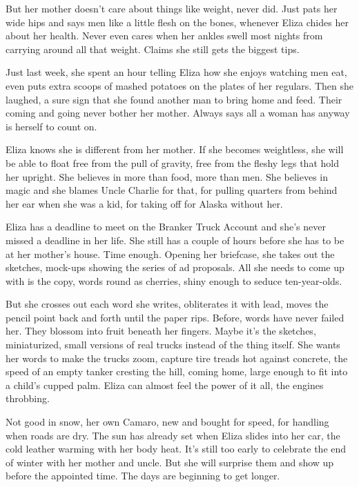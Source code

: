 \documentclass[
]{article}
\begin{document}
But her mother doesn't care about things like weight, never did. Just
pats her wide hips and says men like a little flesh on the bones,
whenever Eliza chides her about her health. Never even cares when her
ankles swell most nights from carrying around all that weight. Claims
she still gets the biggest tips.

Just last week, she spent an hour telling Eliza how she enjoys watching
men eat, even puts extra scoops of mashed potatoes on the plates of her
regulars. Then she laughed, a sure sign that she found another man to
bring home and feed. Their coming and going never bother her mother.
Always says all a woman has anyway is herself to count on.

Eliza knows she is different from her mother. If she becomes weightless,
she will be able to float free from the pull of gravity, free from the
fleshy legs that hold her upright. She believes in more than food, more
than men. She believes in magic and she blames Uncle Charlie for that,
for pulling quarters from behind her ear when she was a kid, for taking
off for Alaska without her.

Eliza has a deadline to meet on the Branker Truck Account and she's
never missed a deadline in her life. She still has a couple of hours
before she has to be at her mother's house. Time enough. Opening her
briefcase, she takes out the sketches, mock-ups showing the series of ad
proposals. All she needs to come up with is the copy, words round as
cherries, shiny enough to seduce ten-year-olds.

But she crosses out each word she writes, obliterates it with lead,
moves the pencil point back and forth until the paper rips. Before,
words have never failed her. They blossom into fruit beneath her
fingers. Maybe it's the sketches, miniaturized, small versions of real
trucks instead of the thing itself. She wants her words to make the
trucks zoom, capture tire treads hot against concrete, the speed of an
empty tanker cresting the hill, coming home, large enough to fit into a
child's cupped palm. Eliza can almost feel the power of it all, the
engines throbbing.

Not good in snow, her own Camaro, new and bought for speed, for handling
when roads are dry. The sun has already set when Eliza slides into her
car, the cold leather warming with her body heat. It's still too early
to celebrate the end of winter with her mother and uncle. But she will
surprise them and show up before the appointed time. The days are
beginning to get longer.
\end{document}
